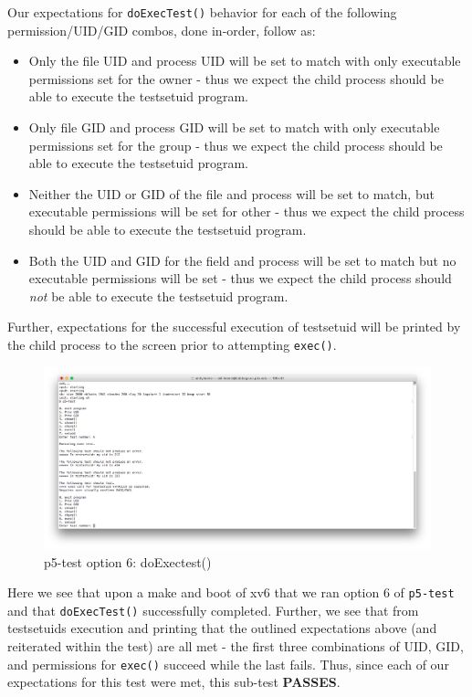 \documentclass[11pt,letterpaper]{report}
\begin{document}
	Our expectations for {\tt doExecTest()} behavior for each of the following permission/UID/GID combos, done in-order, follow as:
	\begin{itemize}
	
		\item Only the file UID and process UID will be set to match with only executable permissions set for the owner - thus we expect the child process should be able to execute the testsetuid program.
		\item Only file GID and process GID will be set to match with only executable permissions set for the group - thus we expect the child process should be able to execute the testsetuid program.
		\item Neither the UID or GID of the file and process will be set to match, but executable permissions will be set for other - thus we expect the child process should be able to execute 
		the testsetuid program.
		\item Both the UID and GID for the field and process will be set to match but no executable permissions will be set - thus we expect the child process should \emph{not} be able to execute the testsetuid program.
	\end{itemize}
		Further, expectations for the successful execution of testsetuid will be printed by the child process to the screen prior to attempting {\tt exec()}.
\begin{figure}[h!]
\centering
\includegraphics[width=0.8\linewidth]{doexectest.png}
\caption{p5-test option 6: doExectest()}
\label{fig:datetest}
\end{figure}

\pagebreak 

Here we see that upon a make and boot of xv6 that we ran option 6 of {\tt p5-test} and that {\tt doExecTest()} successfully completed. Further, we see that from
testsetuids execution and printing that the outlined expectations above (and reiterated within the test) are all met - the first three combinations of UID, GID, and permissions 
for {\tt exec()} succeed while the last fails. 
Thus, since each of our expectations for this test were met, this sub-test \textbf{PASSES}.
		
\end{document}
